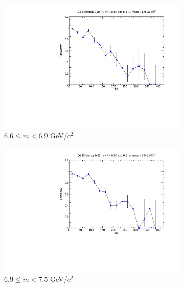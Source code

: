 \begin{figure}[p]
\begin{subfigure}[b]{0.32\textwidth}
        \includegraphics[width=\textwidth]{./kTrackerEfficiencyPlots/D2_Efficiency_xF5_mass8.pdf}
        \caption{$6.6 \leq m < 6.9$ GeV/$c^2$}
        \label{fig:xF5_mass8}
    \end{subfigure}
    \vspace{0.5cm}
    \begin{subfigure}[b]{0.32\textwidth}
        \centering
        \includegraphics[width=\textwidth]{./kTrackerEfficiencyPlots/D2_Efficiency_xF5_mass9.pdf}
        \caption{$6.9 \leq m < 7.5$ GeV/$c^2$}
        \label{fig:xF5_mass9}
    \end{subfigure}
    \hfill
    \begin{subfigure}[b]{0.32\textwidth}
        \centering

\end{subfigure}
\end{figure}
